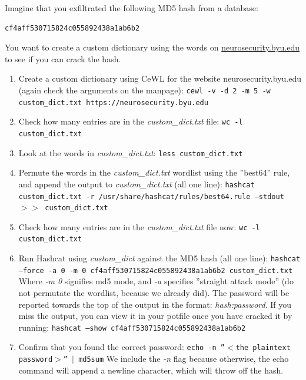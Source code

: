 \documentclass{article}
\begin{document}
Imagine that you exfiltrated the following MD5 hash from a database:
\begin{lstlisting}
cf4aff530715824c055892438a1ab6b2
\end{lstlisting}
You want to create a custom dictionary using the words on \href{neurosecurity.byu.edu}{neurosecurity.byu.edu} to see if you can crack the hash.
\begin{enumerate}
\item Create a custom dictionary using CeWL for the website neurosecurity.byu.edu (again check the arguments on the manpage): \texttt{cewl -v -d 2 -m 5 -w custom\_dict.txt https://neurosecurity.byu.edu}
\item Check how many entries are in the \textit{custom\_dict.txt} file: \texttt{wc -l custom\_dict.txt}
  \item Look at the words in \textit{custom\_dict.txt}: \texttt{less custom\_dict.txt}
  \item Permute the words in the \textit{custom\_dict.txt} wordlist using the ''best64'' rule, and append the output to \textit{custom\_dict.txt} (all one line): \texttt{hashcat custom\_dict.txt -r /usr/share/hashcat/rules/best64.rule --stdout $>>$ custom\_dict.txt}
    \item Check how many entries are in the \textit{custom\_dict.txt} file now: \texttt{wc -l custom\_dict.txt}
    \item Run Hashcat using \textit{custom\_dict} against the MD5 hash (all one line): \texttt{hashcat --force -a 0 -m 0 cf4aff530715824c055892438a1ab6b2 custom\_dict.txt} Where \textit{-m 0} signifies md5 mode, and \textit{-a} specifies ''straight attack mode'' (do not permutate the wordlist, because we already did). The password will be reported towards the top of the output in the format: \textit{hash:password}. If you miss the output, you can view it in your potfile once you have cracked it by running: \texttt{hashcat --show cf4aff530715824c055892438a1ab6b2}
    \item Confirm that you found the correct password: \texttt{echo -n ''$<$the plaintext password$>$'' $|$ md5sum} We include the \textit{-n} flag because otherwise, the echo command will append a newline character, which will throw off the hash.
\end{enumerate}
\end{document}
